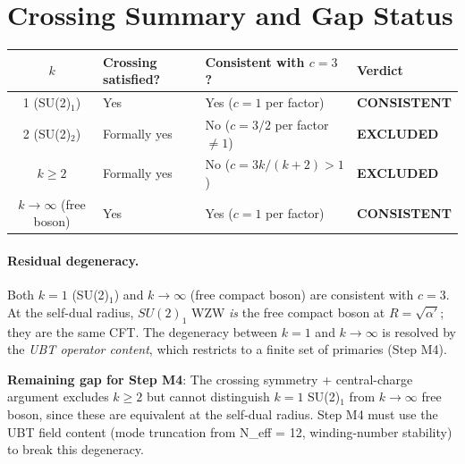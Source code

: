\documentclass[12pt,a4paper]{article}
\theoremstyle{definition}
\theoremstyle{remark}
\begin{document}
\section{Crossing Summary and Gap Status}
\label{sec:m3:summary}

\begin{center}
\renewcommand{\arraystretch}{1.3}
\begin{tabular}{clll}
\toprule
$k$ & Crossing satisfied? & Consistent with $c=3$? & Verdict \\
\midrule
1 (SU(2)$_1$) & Yes & Yes ($c=1$ per factor) & \textbf{CONSISTENT} \\
2 (SU(2)$_2$) & Formally yes & No ($c=3/2$ per factor $\neq 1$) & \textbf{EXCLUDED} \\
$k \geq 2$     & Formally yes & No ($c = 3k/(k+2) > 1$) & \textbf{EXCLUDED} \\
$k \to \infty$ (free boson) & Yes & Yes ($c=1$ per factor) & \textbf{CONSISTENT} \\
\bottomrule
\end{tabular}
\end{center}

\paragraph{Residual degeneracy.}
Both $k = 1$ (SU(2)$_1$) and $k \to \infty$ (free compact boson) are consistent
with $c = 3$.  At the self-dual radius, $SU(2)_1$ WZW \emph{is} the free compact
boson at $R = \sqrt{\alpha'}$; they are the same CFT.  The degeneracy between
$k=1$ and $k \to \infty$ is resolved by the \emph{UBT operator content}, which
restricts to a finite set of primaries (Step M4).

\begin{gapbox}
\textbf{Remaining gap for Step M4}: The crossing symmetry + central-charge
argument excludes $k \geq 2$ but cannot distinguish $k = 1$ SU(2)$_1$
from $k \to \infty$ free boson, since these are equivalent at the self-dual
radius.  Step M4 must use the UBT field content (mode truncation from
N\_eff = 12, winding-number stability) to break this degeneracy.
\end{gapbox}

\ifdefined\INCLUDEMODE
\else
  
\end{document}
